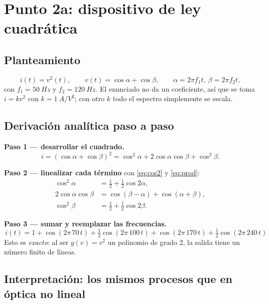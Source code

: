 \documentclass[11pt,letterpaper]{article}
\begin{document}
\section{Punto 2a: dispositivo de ley cuadrática}

\subsection{Planteamiento}
\begin{equation}
  i(t)=v^2(t),\qquad v(t)=\cos\alpha+\cos\beta,\qquad \alpha=2\pi f_1 t,\ \beta=2\pi f_2 t,
\end{equation}
con $f_1=\SI{50}{Hz}$ y $f_2=\SI{120}{Hz}$. El enunciado no da un coeficiente, así que se toma
$i=k v^2$ con $k=\SI{1}{A/V^2}$; con otro $k$ todo el espectro simplemente se escala.

\subsection{Derivación analítica paso a paso}

\textbf{Paso 1 — desarrollar el cuadrado.}
\begin{equation}
  i=(\cos\alpha+\cos\beta)^2=\cos^2\alpha+2\cos\alpha\cos\beta+\cos^2\beta .
\end{equation}

\textbf{Paso 2 — linealizar cada término} con \eqref{eq:cos2} y \eqref{eq:prod}:
\begin{align}
  \cos^2\alpha &= \tfrac12+\tfrac12\cos2\alpha, \\
  2\cos\alpha\cos\beta &= \cos(\beta-\alpha)+\cos(\alpha+\beta), \\
  \cos^2\beta &= \tfrac12+\tfrac12\cos2\beta .
\end{align}

\textbf{Paso 3 — sumar y reemplazar las frecuencias.}
\begin{equation}
  \boxed{\,i(t)=1+\cos(2\pi\,70\,t)+\tfrac12\cos(2\pi\,100\,t)+\cos(2\pi\,170\,t)+\tfrac12\cos(2\pi\,240\,t)\,}
  \label{eq:2a}
\end{equation}
Esto es \emph{exacto}: al ser $g(v)=v^2$ un polinomio de grado 2, la salida tiene un número finito de líneas.

\subsection{Interpretación: los mismos procesos que en óptica no lineal}
\end{document}
